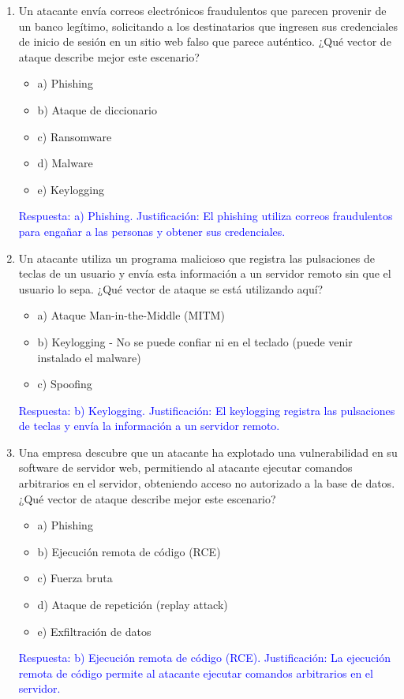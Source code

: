 \documentclass[a4paper]{article}
\begin{document}
\begin{enumerate}
    \item Un atacante envía correos electrónicos fraudulentos que parecen provenir de un banco legítimo, solicitando a los destinatarios que ingresen sus credenciales de inicio de sesión en un sitio web falso que parece auténtico.
    ¿Qué vector de ataque describe mejor este escenario?
    \begin{itemize}
        \item a) Phishing
        \item b) Ataque de diccionario
        \item c) Ransomware
        \item d) Malware
        \item e) Keylogging
    \end{itemize}
    \textcolor{blue}{Respuesta: a) Phishing. Justificación: El phishing utiliza correos fraudulentos para engañar a las personas y obtener sus credenciales.}
    \vspace{1cm}
    
    \item Un atacante utiliza un programa malicioso que registra las pulsaciones de teclas de un usuario y envía esta información a un servidor remoto sin que el usuario lo sepa.
    ¿Qué vector de ataque se está utilizando aquí?
    \begin{itemize}
        \item a) Ataque Man-in-the-Middle (MITM)
        \item b) Keylogging - No se puede confiar ni en el teclado (puede venir instalado el malware)
        \item c) Spoofing
    \end{itemize}
    \textcolor{blue}{Respuesta: b) Keylogging. Justificación: El keylogging registra las pulsaciones de teclas y envía la información a un servidor remoto.}
    \vspace{1cm}
    
    \item Una empresa descubre que un atacante ha explotado una vulnerabilidad en su software de servidor web, permitiendo al atacante ejecutar comandos arbitrarios en el servidor, obteniendo acceso no autorizado a la base de datos.
    ¿Qué vector de ataque describe mejor este escenario?
    \begin{itemize}
        \item a) Phishing
        \item b) Ejecución remota de código (RCE)
        \item c) Fuerza bruta
        \item d) Ataque de repetición (replay attack)
        \item e) Exfiltración de datos
    \end{itemize}
    \textcolor{blue}{Respuesta: b) Ejecución remota de código (RCE). Justificación: La ejecución remota de código permite al atacante ejecutar comandos arbitrarios en el servidor.}
    \vspace{1cm}
    

\end{enumerate}
\end{document}
